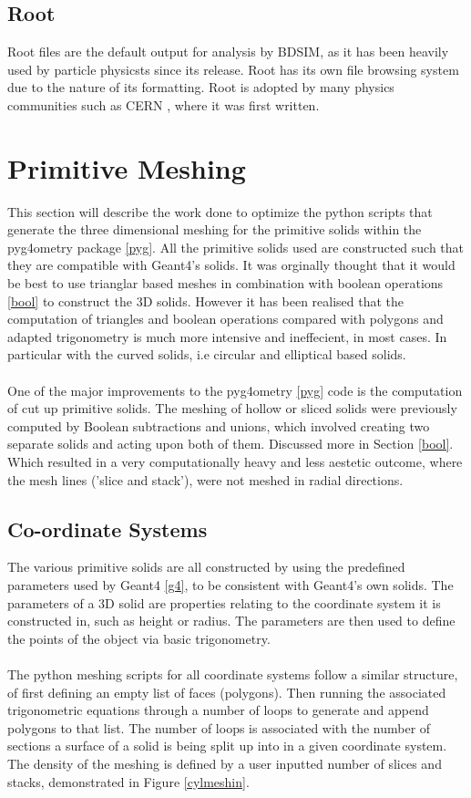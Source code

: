 \documentclass[12pt,a4paper]{article}
\begin{document}
\subsection{Root}\label{root}
Root files are the default output for analysis by BDSIM, as it has been heavily used by particle physicsts since its release. Root has its own file browsing system due to the nature of its formatting. Root is adopted by many physics communities such as CERN \cite{cern}, where it was first written.


\newpage
\section{Primitive Meshing}
\label{prim}
This section will describe the work done to optimize the python scripts that generate the three dimensional meshing for the primitive solids within the pyg4ometry package \ref{pyg}. All the primitive solids used are constructed such that they are compatible with Geant4's solids. It was orginally thought that it would be best to use trianglar based meshes in combination with boolean operations \ref{bool} to construct the 3D solids. However it has been realised that the computation of triangles and boolean operations compared with polygons and adapted trigonometry is much more intensive and ineffecient, in most cases. In particular with the curved solids, i.e circular and elliptical based solids.
\\\\
One of the major improvements to the pyg4ometry \ref{pyg} code is the computation of cut up primitive solids. The meshing of hollow or sliced solids were previously computed by Boolean subtractions and unions, which involved creating two separate solids and acting upon both of them. Discussed more in Section \ref{bool}. Which resulted in a very computationally heavy and less aestetic outcome, where the mesh lines ('slice and stack'), were not meshed in radial directions.

\subsection{Co-ordinate Systems}
The various primitive solids are all constructed by using the predefined parameters used by Geant4 \ref{g4}, to be consistent with Geant4's own solids. The parameters of a 3D solid are properties relating to the coordinate system it is constructed in, such as height or radius. The parameters are then used to define the points of the object via basic trigonometry.
\\\\
The python meshing scripts for all coordinate systems follow a similar structure, of first defining an empty list of faces (polygons). Then running the associated trigonometric equations through a number of loops to generate and append polygons to that list. The number of loops is associated with the number of sections a surface of a solid is being split up into in a given coordinate system. The density of the meshing is defined by a user inputted number of slices and stacks, demonstrated in Figure \ref{cylmeshin}.
\end{document}
